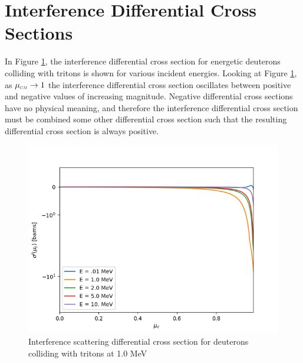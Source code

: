 \section{Interference Differential Cross Sections}
In Figure \ref{fig:sig_i}, the interference differential cross section for energetic deuterons colliding with tritons is shown for various incident energies. Looking at Figure \ref{fig:sig_i}, as $\mucm \rightarrow 1$ the interference differential cross section oscillates between positive and negative values of increasing magnitude. Negative differential cross sections have no physical meaning, and therefore the interference differential cross section must be combined some other differential cross section such that the resulting differential cross section is always positive.

\begin{figure}[!htb]
    \centering
    \includegraphics[scale=0.75]{../figures/proposed_work/sig_i_dt.png}
    \caption{Interference scattering differential cross section for deuterons colliding with tritons at 1.0 MeV}
    \label{fig:sig_i}
\end{figure}